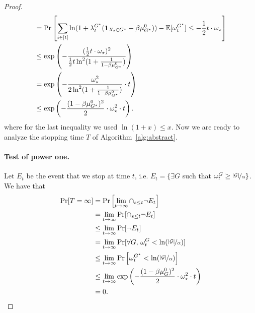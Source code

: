 \begin{proof}
\begin{align*}
&= 
\Pr\left[\sum_{i \in [t]} \ln(1 + \lambda_t^{G^\star}(\mathbf{1}_{X_t \in {G^\star}} - \beta\mu_{G^\star}^0)) - \mathbb{E}[\omega_t^{{G^\star}}] \leq -\frac{1}{2} t \cdot \omega_\star \right] \\
&\leq \exp\left(-\frac{(\frac{1}{2} t \cdot \omega_\star)^2}{\frac{1}{2}t \ln^2(1+ \frac{1}{1-\beta\mu_{G^\star}^0})}\right)  
\\&= \exp\left(-\frac{\omega_\star^2}{2\ln^2(1+ \frac{1}{1-\beta\mu_{G^\star}^0})} \cdot t \right) \\
&\leq  \exp\left(- \frac{(1-\beta\mu_{G^\star}^0)^2}{2} \cdot \omega_\star^2 \cdot t \right). 
\end{align*}
where for the last inequality we used $\ln{(1+x)} \leq x$. Now we are ready to analyze the stopping time $T$ of Algorithm~\ref{alg:abstract}. 

\paragraph{Test of power one.} Let $E_t$ be the event that we stop at time $t$, i.e. $E_t = \{\exists G$ such that $\omega_t^G \geq {\nicefrac{|{\mathcal{G}}|}{\alpha}}\}$. We have that
\begin{align*}
\Pr[T = \infty] &= \Pr\left[\lim_{t \to \infty} \cap_{s \leq t} \neg E_t\right] \\
&= \lim_{t \to \infty} \Pr[ \cap_{s \leq t} \neg E_t] \\
&\leq \lim_{t \to \infty} \Pr[ \neg E_t] \\
&= \lim_{t \to \infty} \Pr[\forall G, \, \omega_t^G < \ln({\nicefrac{|{\mathcal{G}}|}{\alpha}})] \\
&\leq \lim_{t \to \infty}\Pr\left[\omega_t^{{G^\star}} < \ln({\nicefrac{|{\mathcal{G}}|}{\alpha}})\right] \\
&\leq \lim_{t \to \infty}\exp\left(- \frac{(1-\beta{\mu_G^0})^2}{2} \cdot \omega_\star^2 \cdot t \right) \\
&= 0.
\end{align*}


\end{proof}
